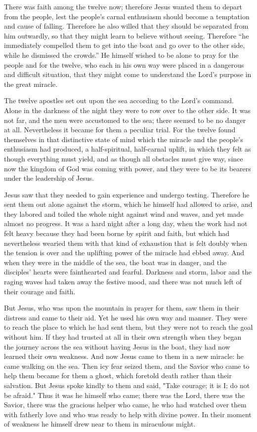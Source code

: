 There was faith among the twelve now; therefore Jesus wanted them to depart from the people, lest the people’s carnal enthusiasm should become a temptation and cause of falling. Therefore he also willed that they should be separated from him outwardly, so that they might learn to believe without seeing. Therefore “he immediately compelled them to get into the boat and go over to the other side, while he dismissed the crowds.” He himself wished to be alone to pray for the people and for the twelve, who each in his own way were placed in a dangerous and difficult situation, that they might come to understand the Lord’s purpose in the great miracle.

The twelve apostles set out upon the sea according to the Lord’s command. Alone in the darkness of the night they were to row over to the other side. It was not far, and the men were accustomed to the sea; there seemed to be no danger at all. Nevertheless it became for them a peculiar trial. For the twelve found themselves in that distinctive state of mind which the miracle and the people’s enthusiasm had produced, a half-spiritual, half-carnal uplift, in which they felt as though everything must yield, and as though all obstacles must give way, since now the kingdom of God was coming with power, and they were to be its bearers under the leadership of Jesus.

Jesus saw that they needed to gain experience and undergo testing. Therefore he sent them out alone against the storm, which he himself had allowed to arise, and they labored and toiled the whole night against wind and waves, and yet made almost no progress. It was a hard night after a long day, when the work had not felt heavy because they had been borne by spirit and faith, but which had nevertheless wearied them with that kind of exhaustion that is felt doubly when the tension is over and the uplifting power of the miracle had ebbed away. And when they were in the middle of the sea, the boat was in danger, and the disciples’ hearts were fainthearted and fearful. Darkness and storm, labor and the raging waves had taken away the festive mood, and there was not much left of their courage and faith.

But Jesus, who was upon the mountain in prayer for them, saw them in their distress and came to their aid. Yet he used his own way and manner. They were to reach the place to which he had sent them, but they were not to reach the goal without him. If they had trusted at all in their own strength when they began the journey across the sea without having Jesus in the boat, they had now learned their own weakness. And now Jesus came to them in a new miracle: he came walking on the sea. Then icy fear seized them, and the Savior who came to help them became for them a ghost, which foretold death rather than their salvation. But Jesus spoke kindly to them and said, "Take courage; it is I; do not be afraid." Thus it was he himself who came; there was the Lord, there was the Savior, there was the gracious helper who came, he who had watched over them with fatherly love and who was ready to help with divine power. In their moment of weakness he himself drew near to them in miraculous might.

